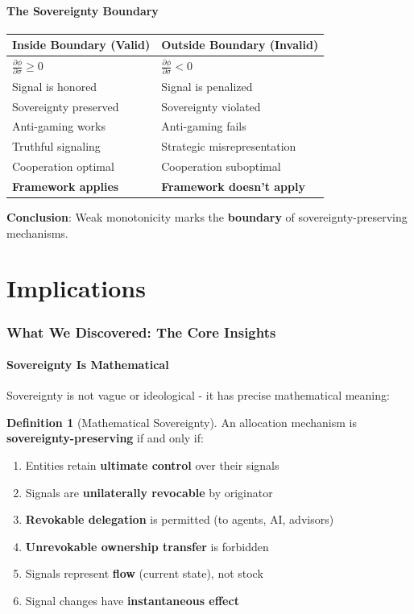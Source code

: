 \documentclass[11pt,a4paper]{article}
\theoremstyle{definition}
\newtheorem{definition}[theorem]{Definition}
\theoremstyle{remark}
\begin{document}
\subsection{The Sovereignty Boundary}

\begin{center}
\begin{tabular}{ll}
\toprule
\textbf{Inside Boundary (Valid)} & \textbf{Outside Boundary (Invalid)} \\
\midrule
$\frac{\partial \phi}{\partial \sigma} \ge 0$ & $\frac{\partial \phi}{\partial \sigma} < 0$ \\
Signal is honored & Signal is penalized \\
Sovereignty preserved & Sovereignty violated \\
Anti-gaming works & Anti-gaming fails \\
Truthful signaling & Strategic misrepresentation \\
Cooperation optimal & Cooperation suboptimal \\
\midrule
\textbf{Framework applies} & \textbf{Framework doesn't apply} \\
\bottomrule
\end{tabular}
\end{center}

\textbf{Conclusion}: Weak monotonicity marks the \textbf{boundary} of sovereignty-preserving mechanisms.

\part{Implications}

\section{What We Discovered: The Core Insights}

\subsection{Sovereignty Is Mathematical}

Sovereignty is not vague or ideological - it has precise mathematical meaning:

\begin{definition}[Mathematical Sovereignty]
An allocation mechanism is \textbf{sovereignty-preserving} if and only if:
\begin{enumerate}
\item Entities retain \textbf{ultimate control} over their signals
\item Signals are \textbf{unilaterally revocable} by originator
\item \textbf{Revokable delegation} is permitted (to agents, AI, advisors)
\item \textbf{Unrevokable ownership transfer} is forbidden
\item Signals represent \textbf{flow} (current state), not stock
\item Signal changes have \textbf{instantaneous effect}
\end{enumerate}
\end{definition}
\end{document}
